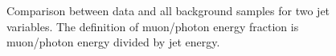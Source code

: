 \begin{figure}[hbtp]
  \centering
  \hspace{0.5cm}
  \caption{\label{fig:MuPhoEF}Comparison between data and all background samples for two jet variables. The definition of muon/photon  energy fraction is muon/photon energy divided by jet energy.}
\end{figure}

